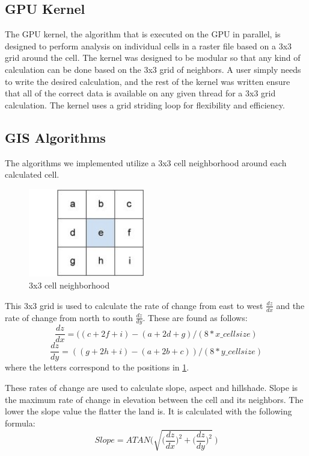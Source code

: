 \documentclass[journal]{IEEEtran}
\begin{document}
    \subsection{GPU Kernel}
    The GPU kernel, the algorithm that is executed on the GPU in parallel, is
    designed to perform analysis on individual cells in a raster file based on
    a 3x3 grid around the cell. The kernel was designed to be modular so that
    any kind of calculation can be done based on the 3x3 grid of neighbors. A
    user simply needs to write the desired calculation, and the rest of the
    kernel was written ensure that all of the correct data is available on any
    given thread for a 3x3 grid calculation.  The kernel uses a grid striding
    loop for flexibility and
    efficiency\cite{grid_stride}.

    \subsection{GIS Algorithms}
    The algorithms we implemented utilize a 3x3 cell neighborhood around each 
    calculated cell. 
    \begin{figure}
        \center
        \includegraphics[width=2in]{GISgrid.jpg}
        \caption{3x3 cell neighborhood}
        \label{GIS grid}
    \end{figure}
    This 3x3 grid is used to calculate the rate of change from east to west
    \(\frac{dz}{dx}\) and the rate of change from north to south
    \(\frac{dz}{dy}\). These are found as follows:
    \[\frac{dz}{dx} = ((c + 2f + i) - (a + 2d + g) / (8 * x\_cellsize)\]
    \[\frac{dz}{dy} = ((g + 2h + i) - (a + 2b + c)) / ( 8 * y\_cellsize)\]
    where the letters correspond to the positions in \ref{GIS grid}.

    These rates of change are used to calculate slope, aspect and hillshade.
    Slope is the maximum rate of change in elevation between the cell and its
    neighbors. The lower the slope value the flatter the land is. It is
    calculated with the following formula:
    \[Slope = ATAN\Bigg(\sqrt{\Big(\frac{dz}{dx}\Big)^{2} + \Big(\frac{dz}{dy}\Big)^{2}}~\Bigg)\]
\end{document}
